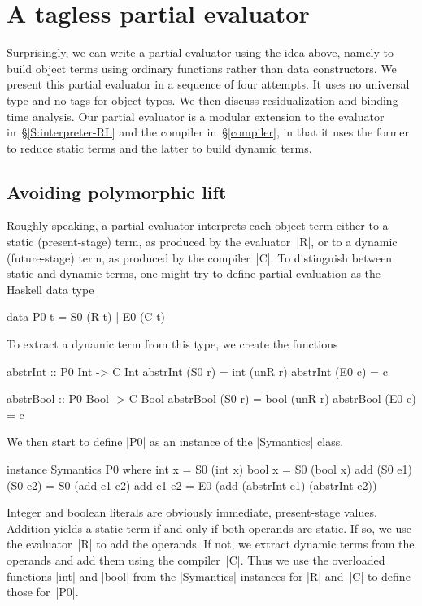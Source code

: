 \documentclass[preprint]{sigplanconf}
\begin{document}
\section{A tagless partial evaluator}\label{PE}

Surprisingly, we can write a partial evaluator using the idea above,
namely to build object terms using ordinary functions rather than data
constructors.  We present this partial evaluator in a sequence of four
attempts. It uses no universal type and no tags
for object types.  We then discuss residualization and binding-time
analysis.  Our partial evaluator is a modular extension to the evaluator
in~\S\ref{S:interpreter-RL} and the compiler in~\S\ref{compiler}, in
that it uses the former to reduce static terms and the latter to build
dynamic terms.

\subsection{Avoiding polymorphic lift}
\label{S:PE-lift}

Roughly speaking, a partial evaluator interprets each object term either
to a static (present-stage) term, as produced by the evaluator~|R|, or
to a dynamic (future-stage) term, as produced by the compiler~|C|.  To
distinguish between static and dynamic terms, one might try
to define partial evaluation as the Haskell data type
\begin{code}
data P0 t = S0 (R t) | E0 (C t)
\end{code}
To extract a dynamic term from this type, we create the functions
\begin{code}
abstrInt :: P0 Int -> C Int
abstrInt (S0 r) = int (unR r)
abstrInt (E0 c) = c

abstrBool :: P0 Bool -> C Bool
abstrBool (S0 r) = bool (unR r)
abstrBool (E0 c) = c
\end{code}
We then start to define |P0| as an instance of the |Symantics| class.
\begin{code}
instance Symantics P0 where
  int  x = S0 (int x)
  bool x = S0 (bool x)
  add (S0 e1) (S0 e2) = S0 (add e1 e2)
  add e1 e2 = E0 (add (abstrInt e1)
                      (abstrInt e2))
\end{code}
Integer and boolean literals are obviously immediate, present-stage
values. Addition yields a static term if and only if both operands
are static. If so, we use the evaluator~|R| to add the operands.
If not, we extract dynamic terms from the operands and add them
using the compiler~|C|.
Thus we use the overloaded functions |int| and |bool| from the |Symantics|
instances for |R| and~|C| to define those for~|P0|.
\end{document}
